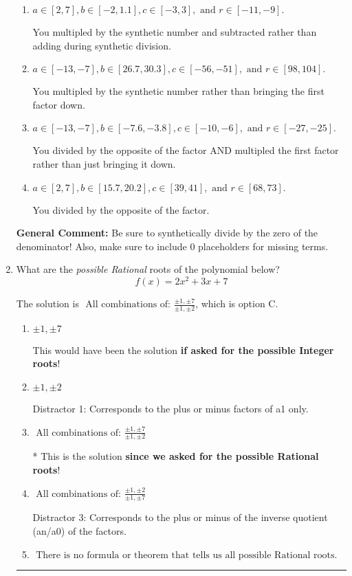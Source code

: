 \documentclass{extbook}[14pt]
\newcommand{\litem}[1]{\item #1

\rule{\textwidth}{0.4pt}}
\begin{document}
\begin{enumerate}
{\begin{enumerate}[label=\Alph*.]
* This is the solution!
\item \( a \in [2, 7], b \in [-2, 1.1], c \in [-3, 3], \text{ and } r \in [-11, -9]. \)

 You multipled by the synthetic number and subtracted rather than adding during synthetic division.
\item \( a \in [-13, -7], b \in [26.7, 30.3], c \in [-56, -51], \text{ and } r \in [98, 104]. \)

 You multipled by the synthetic number rather than bringing the first factor down.
\item \( a \in [-13, -7], b \in [-7.6, -3.8], c \in [-10, -6], \text{ and } r \in [-27, -25]. \)

 You divided by the opposite of the factor AND multipled the first factor rather than just bringing it down.
\item \( a \in [2, 7], b \in [15.7, 20.2], c \in [39, 41], \text{ and } r \in [68, 73]. \)

 You divided by the opposite of the factor.
\end{enumerate}

\textbf{General Comment:} Be sure to synthetically divide by the zero of the denominator! Also, make sure to include 0 placeholders for missing terms.
}
\litem{
What are the \textit{possible Rational} roots of the polynomial below?
\[ f(x) = 2x^{2} +3 x + 7 \]

The solution is \( \text{ All combinations of: }\frac{\pm 1,\pm 7}{\pm 1,\pm 2} \), which is option C.\begin{enumerate}[label=\Alph*.]
\item \( \pm 1,\pm 7 \)

This would have been the solution \textbf{if asked for the possible Integer roots}!
\item \( \pm 1,\pm 2 \)

 Distractor 1: Corresponds to the plus or minus factors of a1 only.
\item \( \text{ All combinations of: }\frac{\pm 1,\pm 7}{\pm 1,\pm 2} \)

* This is the solution \textbf{since we asked for the possible Rational roots}!
\item \( \text{ All combinations of: }\frac{\pm 1,\pm 2}{\pm 1,\pm 7} \)

 Distractor 3: Corresponds to the plus or minus of the inverse quotient (an/a0) of the factors. 
\item \( \text{ There is no formula or theorem that tells us all possible Rational roots.} \)


\end{enumerate}}
\end{enumerate}
\end{document}
